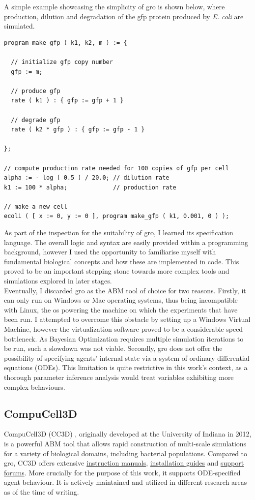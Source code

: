 \documentclass[bsc,frontabs,singlespacing,parskip,deptreport]{infthesis}
\begin{document}
A simple example showcasing the simplicity of gro is shown below, where production, dilution and degradation of the gfp protein produced by \textit{E. coli} are simulated.

\begin{lstlisting}[basicstyle=\small]
program make_gfp ( k1, k2, m ) := {

  // initialize gfp copy number
  gfp := m;

  // produce gfp
  rate ( k1 ) : { gfp := gfp + 1 }

  // degrade gfp
  rate ( k2 * gfp ) : { gfp := gfp - 1 }

};

// compute production rate needed for 100 copies of gfp per cell
alpha := - log ( 0.5 ) / 20.0; // dilution rate
k1 := 100 * alpha;             // production rate

// make a new cell
ecoli ( [ x := 0, y := 0 ], program make_gfp ( k1, 0.001, 0 ) );
\end{lstlisting}

As part of the inspection for the suitability of gro, I learned its specification language. The overall logic and syntax are easily provided within a programming background, however I used the opportunity to familiarise myself with fundamental biological concepts and how these are implemented in code. This proved to be an important stepping stone towards more complex tools and simulations explored in later stages. \\ \newline
Eventually, I discarded gro as the ABM tool of choice for two reasons. Firstly, it can only run on Windows or Mac operating systems, thus being incompatible with Linux, the os powering the machine on which the experiments that have been run. I attempted to overcome this obstacle by setting up a Windows Virtual Machine, however the virtualization software proved to be a considerable speed bottleneck. As Bayesian Optimization requires multiple simulation iterations to be run, such a slowdown was not viable.
Secondly, gro does not offer the possibility of specifying agents' internal state via a system of ordinary differential equations (ODEs). This limitation is quite restrictive in this work's context, as a thorough parameter inference analysis would treat variables exhibiting more complex behaviours.

\subsection{CompuCell3D}\label{sec:compucell3d}
CompuCell3D (CC3D) \cite{pmid22482955}, originally developed at the University of Indiana in 2012, is a powerful ABM tool that allows rapid construction of multi-scale simulations for a variety of biological domains, including bacterial populations. Compared to gro, CC3D offers extensive \href{https://compucell3d.org/Manuals}{instruction manuals}, \href{https://compucell3d.org/DeveloperZone}{installation guides} and \href{https://www.reddit.com/r/CompuCell3D/}{support forums}. More crucially for the purpose of this work, it supports ODE-specified agent behaviour. It is actively maintained and utilized in different research areas as of the time of writing.
\end{document}
